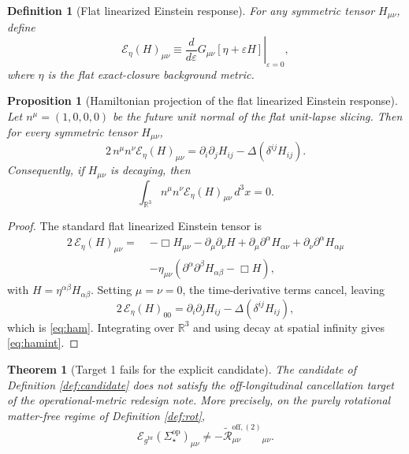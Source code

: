 \documentclass[11pt]{article}
\newcommand{\ReBridge}{g^{\mathrm{br}}}
\newcommand{\SigmaOpStar}{\Sigma^{\mathrm{op}}_\star}
\newcommand{\ReOffTwo}{\widetilde{\mathcal R}_{\mu\nu}^{\mathrm{off},(2)}}
\newcommand{\EinLin}{\mathcal E_{\ReBridge}}
\newcommand{\EinLinFlat}{\mathcal E_{\eta}}
\newtheorem{definition}{Definition}
\newtheorem{proposition}{Proposition}
\newtheorem{theorem}{Theorem}
\begin{document}
\begin{definition}[Flat linearized Einstein response]
\label{def:flat}
For any symmetric tensor \(H_{\mu\nu}\), define
\begin{equation}
\EinLinFlat(H)_{\mu\nu}
\equiv
\left.
\frac{d}{d\varepsilon}
G_{\mu\nu}[\eta+\varepsilon H]
\right|_{\varepsilon=0},
\label{eq:einflat}
\end{equation}
where \(\eta\) is the flat exact-closure background metric.
\end{definition}

\begin{proposition}[Hamiltonian projection of the flat linearized Einstein response]
\label{prop:ham}
Let \(n^\mu=(1,0,0,0)\) be the future unit normal of the flat unit-lapse slicing. Then for every symmetric tensor \(H_{\mu\nu}\),
\begin{equation}
2\,n^\mu n^\nu \EinLinFlat(H)_{\mu\nu}
=
\partial_i\partial_j H_{ij}
-\Delta(\delta^{ij}H_{ij}).
\label{eq:ham}
\end{equation}
Consequently, if \(H_{\mu\nu}\) is decaying, then
\begin{equation}
\int_{\mathbb R^3}
n^\mu n^\nu \EinLinFlat(H)_{\mu\nu}\,d^3x
=
0.
\label{eq:hamint}
\end{equation}
\end{proposition}

\begin{proof}
The standard flat linearized Einstein tensor is
\begin{align*}
2\,\EinLinFlat(H)_{\mu\nu}
=\;&
-\Box H_{\mu\nu}
-\partial_\mu\partial_\nu H
+\partial_\mu\partial^\alpha H_{\alpha\nu}
+\partial_\nu\partial^\alpha H_{\alpha\mu}
\\
&-\eta_{\mu\nu}
\left(
\partial^\alpha\partial^\beta H_{\alpha\beta}
-\Box H
\right),
\end{align*}
with \(H=\eta^{\alpha\beta}H_{\alpha\beta}\). Setting \(\mu=\nu=0\), the time-derivative terms cancel, leaving
\[
2\,\EinLinFlat(H)_{00}
=
\partial_i\partial_j H_{ij}
-\Delta(\delta^{ij}H_{ij}),
\]
which is \eqref{eq:ham}. Integrating over \(\mathbb R^3\) and using decay at spatial infinity gives \eqref{eq:hamint}.
\end{proof}

\begin{theorem}[Target 1 fails for the explicit candidate]
\label{thm:target1}
The candidate of Definition \ref{def:candidate} does \emph{not} satisfy the off-longitudinal cancellation target of the operational-metric redesign note. More precisely, on the purely rotational matter-free regime of Definition \ref{def:rot},
\begin{equation}
\EinLin(\SigmaOpStar)_{\mu\nu}
\neq
-\ReOffTwo{}_{\mu\nu}.
\label{eq:fail1}
\end{equation}
\end{theorem}
\end{document}
